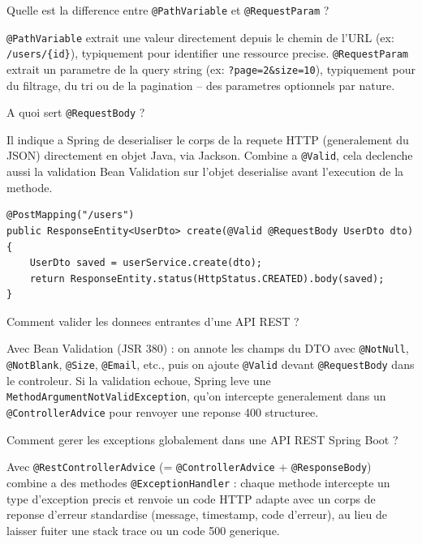 \documentclass[11pt,a4paper]{article}
\begin{document}
\begin{question} Quelle est la difference entre \texttt{@PathVariable} et \texttt{@RequestParam} ?
\end{question}
\begin{reponse}
\texttt{@PathVariable} extrait une valeur directement depuis le chemin de l'URL (ex: \texttt{/users/\{id\}}), typiquement pour identifier une ressource precise. \texttt{@RequestParam} extrait un parametre de la query string (ex: \texttt{?page=2\&size=10}), typiquement pour du filtrage, du tri ou de la pagination -- des parametres optionnels par nature.
\end{reponse}

\begin{question} A quoi sert \texttt{@RequestBody} ?
\end{question}
\begin{reponse}
Il indique a Spring de deserialiser le corps de la requete HTTP (generalement du JSON) directement en objet Java, via Jackson. Combine a \texttt{@Valid}, cela declenche aussi la validation Bean Validation sur l'objet deserialise avant l'execution de la methode.
\end{reponse}

\begin{lstlisting}
@PostMapping("/users")
public ResponseEntity<UserDto> create(@Valid @RequestBody UserDto dto) {
    UserDto saved = userService.create(dto);
    return ResponseEntity.status(HttpStatus.CREATED).body(saved);
}
\end{lstlisting}

\begin{question} Comment valider les donnees entrantes d'une API REST ?
\end{question}
\begin{reponse}
Avec Bean Validation (JSR 380) : on annote les champs du DTO avec \texttt{@NotNull}, \texttt{@NotBlank}, \texttt{@Size}, \texttt{@Email}, etc., puis on ajoute \texttt{@Valid} devant \texttt{@RequestBody} dans le controleur. Si la validation echoue, Spring leve une \texttt{MethodArgumentNotValidException}, qu'on intercepte generalement dans un \texttt{@ControllerAdvice} pour renvoyer une reponse 400 structuree.
\end{reponse}

\begin{question} Comment gerer les exceptions globalement dans une API REST Spring Boot ?
\end{question}
\begin{reponse}
Avec \texttt{@RestControllerAdvice} (= \texttt{@ControllerAdvice} + \texttt{@ResponseBody}) combine a des methodes \texttt{@ExceptionHandler} : chaque methode intercepte un type d'exception precis et renvoie un code HTTP adapte avec un corps de reponse d'erreur standardise (message, timestamp, code d'erreur), au lieu de laisser fuiter une stack trace ou un code 500 generique.
\end{reponse}
\end{document}
